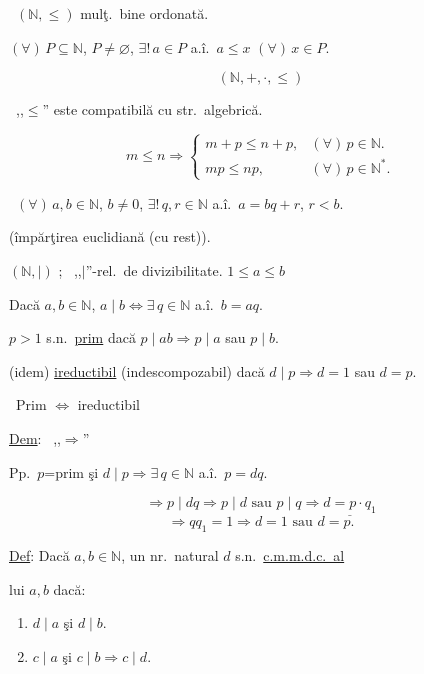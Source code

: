 \bigskip
\noindent{} \ $(\mathbb{N},\leq)$ mulţ.\ bine ordonată.

\noindent $(\forall)\,P\subseteq\mathbb{N}$, $P\neq\varnothing$, $\exists!\,a\in P$ a.î.\ $a\leq x$ $(\forall)\,x\in P$.

\[
(\mathbb{N},+,\cdot,\leq)
\]

\bigskip
\noindent{} \ ,,$\leq$'' este compatibilă cu str.\ algebrică.

\[
m\leq n \Rightarrow
\begin{cases}
m+p\leq n+p, & (\forall)\,p\in\mathbb{N}.\\
mp\leq np, & (\forall)\,p\in\mathbb{N}^*.
\end{cases}
\]

\bigskip
\noindent{} \ $(\forall)\,a,b\in\mathbb{N}$, $b\neq 0$, $\exists!\,q,r\in\mathbb{N}$ a.î.\ $a=bq+r$, $r<b$.

\noindent (împărţirea euclidiană (cu rest)).

\bigskip
\noindent $(\mathbb{N},\mid)$ ; \ ,,$\mid$''-rel.\ de divizibilitate. \hfill $1\leq a\leq b$

\noindent Dacă $a,b\in\mathbb{N}$, $a\mid b \Leftrightarrow \exists\,q\in\mathbb{N}$ a.î.\ $b=aq$.

\bigskip
\noindent $p>1$ s.n.\ \underline{prim} dacă $p\mid ab \Rightarrow p\mid a$ sau $p\mid b$.

\noindent (idem) \underline{ireductibil} (indescompozabil) dacă $d\mid p \Rightarrow d=1$ sau $d=p$.

\bigskip
\noindent{} \ Prim $\Leftrightarrow$ ireductibil

\bigskip
\noindent\underline{Dem}: \ ,,$\Rightarrow$''

\noindent Pp.\ $p$=prim şi $d\mid p \Rightarrow \exists\,q\in\mathbb{N}$ a.î.\ $p=dq$.

\[
\Rightarrow p\mid dq \Rightarrow p\mid d \text{ sau } p\mid q \Rightarrow \underline{d=p\cdot q_1}
\]
\[
\Rightarrow qq_1=1 \Rightarrow d=1 \text{ sau } d=p.
\]

\bigskip
\noindent\underline{Def}: Dacă $a,b\in\mathbb{N}$, un nr.\ natural $d$ s.n.\ \underline{c.m.m.d.c.\ al}

\noindent lui $a,b$ dacă:

\begin{enumerate}
\item[(1)] $d\mid a$ şi $d\mid b$.
\item[(2)] $c\mid a$ şi $c\mid b \Rightarrow c\mid d$.
\end{enumerate}




